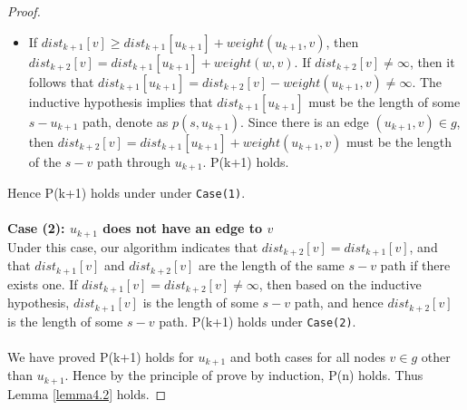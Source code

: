 \begin{proof}
\begin{itemize}
  \item If $dist_{k+1}[v] \geq dist_{k+1}[u_{k+1}] + weight(u_{k+1}, v)$, then $dist_{k+2}[v] = dist_{k+1}[u_{k+1}] + weight(w, v)$. If $dist_{k+2}[v] \neq \infty$, then it follows that $dist_{k+1}[u_{k+1}] = dist_{k+2}[v] - weight(u_{k+1}, v) \neq \infty$. The inductive hypothesis implies that $dist_{k+1}[u_{k+1}]$ must be the length of some $s-u_{k+1}$ path, denote as $p(s, u_{k+1})$. Since there is an edge $(u_{k+1}, v) \in g$, then $dist_{k+2}[v] = dist_{k+1}[u_{k+1}] + weight(u_{k+1}, v)$ must be the length of the $s-v$ path through $u_{k+1}$. P(k+1) holds. 
\end{itemize}
Hence P(k+1) holds under under \texttt{Case(1)}. 
\\\\
\textbf{Case (2): $u_{k+1}$ does not have an edge to $v$}
\tab\\
Under this case, our algorithm indicates that $dist_{k+2}[v] = dist_{k+1}[v]$, and that $dist_{k+1}[v]$ and $dist_{k+2}[v]$ are the length of the same $s-v$ path if there exists one. If $dist_{k+1}[v] = dist_{k+2}[v] \neq \infty$, then based on the inductive hypothesis, $dist_{k+1}[v]$ is the length of some $s-v$ path, and hence $dist_{k+2}[v]$ is the length of some $s-v$ path. P(k+1) holds under \texttt{Case(2)}. 
\\\\
We have proved P(k+1) holds for $u_{k+1}$ and both cases for all nodes $v \in g$ other than $u_{k+1}$. Hence by the principle of prove by induction, P(n) holds. Thus Lemma \ref{lemma4.2} holds. 
\end{proof}
\tab\\ 